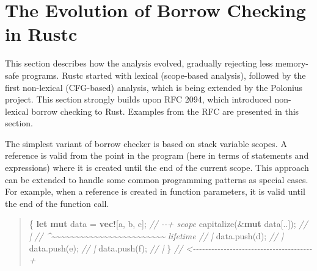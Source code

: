 \documentclass[
  11pt,
  twoside,symmetric]{report}
\newenvironment{Shaded}{}{}
\newcommand{\CharTok}[1]{#1}
\newcommand{\CommentTok}[1]{\textit{#1}}
\newcommand{\KeywordTok}[1]{\textbf{#1}}
\newcommand{\NormalTok}[1]{#1}
\newcommand{\OperatorTok}[1]{#1}
\newcommand{\PreprocessorTok}[1]{\textbf{#1}}
\begin{document}
\section{The Evolution of Borrow Checking in Rustc}\label{sec:evolution}

This section describes how the analysis evolved, gradually rejecting
less memory-safe programs. Rustc started with lexical (scope-based
analysis), followed by the first non-lexical (CFG-based) analysis, which
is being extended by the Polonius project. This section strongly builds
upon RFC 2094, which introduced
non-lexical borrow checking to Rust. Examples from the RFC are presented
in this section.

The simplest variant of borrow checker is based on stack variable
scopes. A reference is valid from the point in the program (here in
terms of statements and expressions) where it is created until the end
of the current scope. This approach can be extended to handle some
common programming patterns as special cases. For example, when a
reference is created in function parameters, it is valid until the end
of the function call.

\begin{quote}
\begin{Shaded}
\begin{Highlighting}[]
\OperatorTok{\{}
    \KeywordTok{let} \KeywordTok{mut}\NormalTok{ data }\OperatorTok{=} \PreprocessorTok{vec!}\NormalTok{[}\CharTok{\textquotesingle{}a\textquotesingle{}}\OperatorTok{,} \CharTok{\textquotesingle{}b\textquotesingle{}}\OperatorTok{,} \CharTok{\textquotesingle{}c\textquotesingle{}}\NormalTok{]}\OperatorTok{;} \CommentTok{// {-}{-}+ \textquotesingle{}scope}
\NormalTok{    capitalize(}\OperatorTok{\&}\KeywordTok{mut}\NormalTok{ data[}\OperatorTok{..}\NormalTok{])}\OperatorTok{;}          \CommentTok{//   |}
 \CommentTok{// \^{}\textasciitilde{}\textasciitilde{}\textasciitilde{}\textasciitilde{}\textasciitilde{}\textasciitilde{}\textasciitilde{}\textasciitilde{}\textasciitilde{}\textasciitilde{}\textasciitilde{}\textasciitilde{}\textasciitilde{}\textasciitilde{}\textasciitilde{}\textasciitilde{}\textasciitilde{}\textasciitilde{}\textasciitilde{}\textasciitilde{}\textasciitilde{}\textasciitilde{}\textasciitilde{}\textasciitilde{} \textquotesingle{}lifetime //   |}
\NormalTok{    data}\OperatorTok{.}\NormalTok{push(}\CharTok{\textquotesingle{}d\textquotesingle{}}\NormalTok{)}\OperatorTok{;}                     \CommentTok{//   |}
\NormalTok{    data}\OperatorTok{.}\NormalTok{push(}\CharTok{\textquotesingle{}e\textquotesingle{}}\NormalTok{)}\OperatorTok{;}                     \CommentTok{//   |}
\NormalTok{    data}\OperatorTok{.}\NormalTok{push(}\CharTok{\textquotesingle{}f\textquotesingle{}}\NormalTok{)}\OperatorTok{;}                     \CommentTok{//   |}
\OperatorTok{\}} \CommentTok{// \textless{}{-}{-}{-}{-}{-}{-}{-}{-}{-}{-}{-}{-}{-}{-}{-}{-}{-}{-}{-}{-}{-}{-}{-}{-}{-}{-}{-}{-}{-}{-}{-}{-}{-}{-}{-}{-}{-}{-}{-}+}
\end{Highlighting}
\end{Shaded}
\end{quote}
\end{document}
